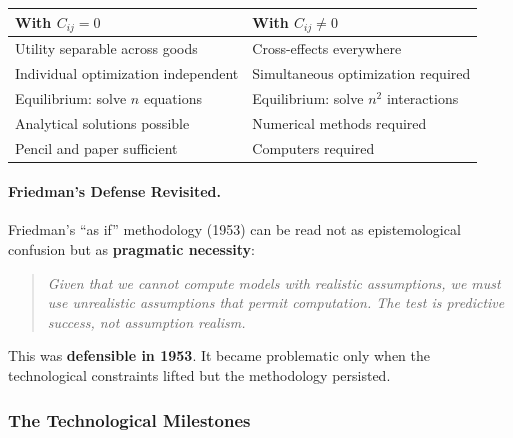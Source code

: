 \begin{center}
\renewcommand{\arraystretch}{1.3}
\begin{tabular}{@{}p{5.5cm}p{5.5cm}@{}}
\toprule
\textbf{With $C_{ij} = 0$} & \textbf{With $C_{ij} \neq 0$} \\
\midrule
Utility separable across goods & Cross-effects everywhere \\
Individual optimization independent & Simultaneous optimization required \\
Equilibrium: solve $n$ equations & Equilibrium: solve $n^2$ interactions \\
Analytical solutions possible & Numerical methods required \\
Pencil and paper sufficient & Computers required \\
\bottomrule
\end{tabular}
\end{center}

\paragraph{Friedman's Defense Revisited.}
Friedman's ``as if'' methodology (1953) can be read not as epistemological
confusion but as \textbf{pragmatic necessity}:

\begin{quote}
\textit{Given that we cannot compute models with realistic assumptions,
we must use unrealistic assumptions that permit computation.
The test is predictive success, not assumption realism.}
\end{quote}

This was \textbf{defensible in 1953}. It became problematic only when
the technological constraints lifted but the methodology persisted.

\subsubsection{The Technological Milestones}

